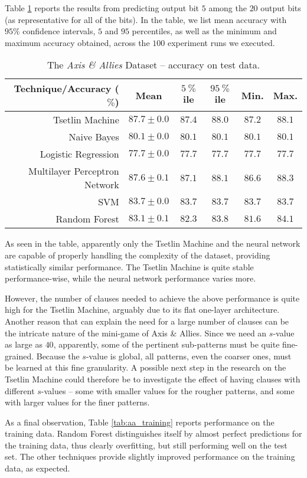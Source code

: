 \documentclass[11pt,a4paper]{article}
\begin{document}
Table \ref{tab:aa_test} reports the results from predicting output bit $5$ among the $20$ output bits (as representative for all of the bits). In the table, we list mean accuracy with $95\%$ confidence intervals, $5$ and $95$ percentiles, as well as the minimum and maximum accuracy obtained, across the $100$ experiment runs we executed. 
\begin{table}[!bh]
    \centering
    \begin{tabular}{r||c|c|c|c|c}
         \bf Technique/Accuracy ($\%$)&\bf Mean&\bf $5~\%$ile &\bf $95~\%$ile&\bf Min.&\bf Max.\\
         \hline
    Tsetlin Machine&$87.7 \pm 0.0$&$87.4$&$88.0$&$87.2$&$88.1$\\
    Naive Bayes&$80.1 \pm 0.0$&$80.1$&$80.1$&$80.1$&$80.1$\\
    Logistic Regression&$77.7 \pm 0.0$&$77.7$&$77.7$&$77.7$&$77.7$\\
    Multilayer Perceptron Network&$87.6 \pm 0.1$&$87.1$&$88.1$&$86.6$&$88.3$\\
    SVM&$83.7 \pm 0.0$&$83.7$&$83.7$&$83.7$&$83.7$\\
    Random Forest&$83.1 \pm 0.1$&$82.3$&$83.8$&$81.6$&$84.1$
    \end{tabular}
    \caption{The \emph{Axis \& Allies} Dataset -- accuracy on test data.}
    \label{tab:aa_test}
\end{table}
As seen in the table, apparently only the Tsetlin Machine and the neural network are capable of properly handling the complexity of the dataset, providing statistically similar performance. The Tsetlin Machine is quite stable performance-wise, while the neural network performance varies more.

However, the number of clauses needed to achieve the above performance is quite high for the Tsetlin Machine, arguably due to its flat one-layer architecture. Another reason that can explain the need for a large number of clauses can be the intricate nature of the mini-game of Axis \& Allies. Since we need an $s$-value as large as $40$, apparently, some of the pertinent sub-patterns must be quite fine-grained. Because the $s$-value is global, all patterns, even the coarser ones, must be learned at this fine granularity. A possible next step in the research on the Tsetlin Machine could therefore be to investigate the effect of having clauses with different $s$-values -- some with smaller values for the rougher patterns, and some with larger values for the finer patterns.

As a final observation, Table \ref{tab:aa_training} reports performance on the training data. Random Forest distinguishes itself by almost perfect predictions for the training data, thus clearly overfitting, but still performing well on the test set. The other techniques provide slightly improved performance on the training data, as expected.
\end{document}
